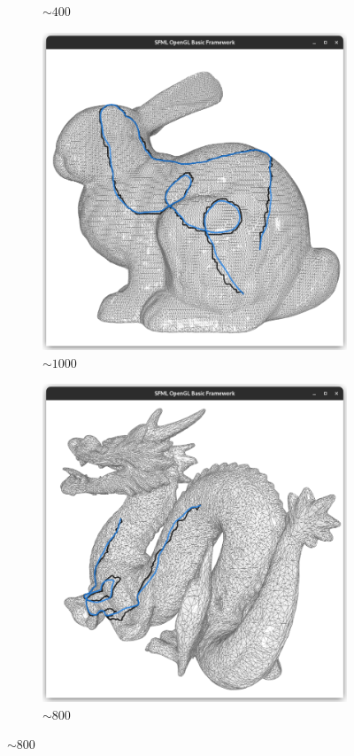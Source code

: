 \documentclass{stdlocal}
\begin{document}
\begin{figure}
\begin{subfigure}[b]{0.24\linewidth}
    \caption{$\sim 400$}
  \end{subfigure}
  \begin{subfigure}[b]{0.24\linewidth}
    \centering
    \includegraphics[width=\linewidth,trim={25px 20 25 50},clip]{images/bunny-smooth-0.95.png}
    \caption{$\sim 1000$}
  \end{subfigure}
  \begin{subfigure}[b]{0.24\linewidth}
    \centering
    \includegraphics[width=\linewidth,trim={25px 20 25 50},clip]{images/dragon-smooth-0.95.png}
    \caption{$\sim 800$}
  \end{subfigure}


\end{figure}
\end{document}
